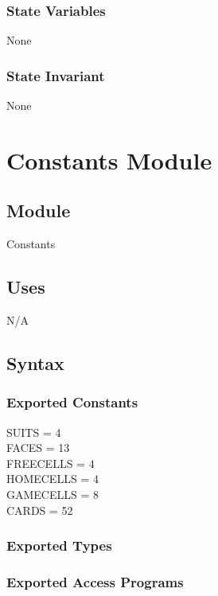 \documentclass[12pt]{article}
\begin{document}
\subsubsection* {State Variables}

None

\subsubsection* {State Invariant}

None

\newpage

\section* {Constants Module}

\subsection*{Module}

Constants

\subsection* {Uses}

N/A

\subsection* {Syntax}

\subsubsection* {Exported Constants}

SUITS = 4\\
FACES = 13\\
FREECELLS = 4\\
HOMECELLS = 4\\
GAMECELLS = 8\\
CARDS = 52

\subsubsection* {Exported Types}

\subsubsection* {Exported Access Programs}
\end{document}
